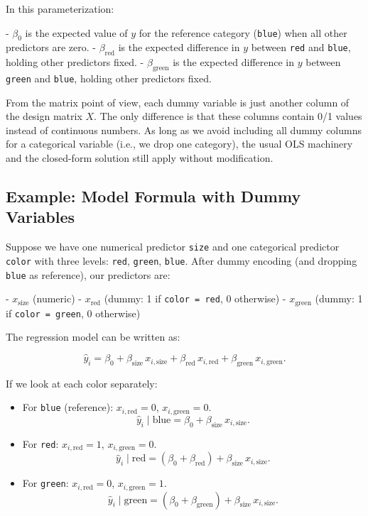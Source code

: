 In this parameterization:

- $\beta_0$ is the expected value of $y$ for the reference category (\texttt{blue}) when all other predictors are zero.  
- $\beta_{\text{red}}$ is the expected difference in $y$ between \texttt{red} and \texttt{blue}, holding other predictors fixed.  
- $\beta_{\text{green}}$ is the expected difference in $y$ between \texttt{green} and \texttt{blue}, holding other predictors fixed.

From the matrix point of view, each dummy variable is just another column of the design matrix $X$. The only difference is that these columns contain 0/1 values instead of continuous numbers. As long as we avoid including all dummy columns for a categorical variable (i.e., we drop one category), the usual OLS machinery and the closed-form solution still apply without modification.

\subsection{Example: Model Formula with Dummy Variables}

Suppose we have one numerical predictor \texttt{size} and one categorical predictor \texttt{color} with three levels: \texttt{red}, \texttt{green}, \texttt{blue}. After dummy encoding (and dropping \texttt{blue} as reference), our predictors are:

- $x_{\text{size}}$ (numeric)
- $x_{\text{red}}$ (dummy: 1 if \texttt{color = red}, 0 otherwise)
- $x_{\text{green}}$ (dummy: 1 if \texttt{color = green}, 0 otherwise)

The regression model can be written as:

\[
\hat{y}_i
= \beta_0
+ \beta_{\text{size}} \, x_{i,\text{size}}
+ \beta_{\text{red}} \, x_{i,\text{red}}
+ \beta_{\text{green}} \, x_{i,\text{green}}.
\]

If we look at each color separately:
\begin{itemize}
  \item For \texttt{blue} (reference): $x_{i,\text{red}} = 0$, $x_{i,\text{green}} = 0$.
  \[
  \hat{y}_i \mid \text{blue}
  = \beta_0 + \beta_{\text{size}} \, x_{i,\text{size}}.
  \]

  \item For \texttt{red}: $x_{i,\text{red}} = 1$, $x_{i,\text{green}} = 0$.
  \[
  \hat{y}_i \mid \text{red}
  = (\beta_0 + \beta_{\text{red}})
  + \beta_{\text{size}} \, x_{i,\text{size}}.
  \]

  \item For \texttt{green}: $x_{i,\text{red}} = 0$, $x_{i,\text{green}} = 1$.
  \[
  \hat{y}_i \mid \text{green}
  = (\beta_0 + \beta_{\text{green}})
  + \beta_{\text{size}} \, x_{i,\text{size}}.
  \]
\end{itemize}


